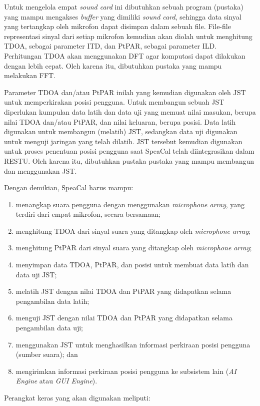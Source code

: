 Untuk mengelola empat \textit{sound card} ini dibutuhkan sebuah program (pustaka) yang mampu mengakses \textit{buffer} yang dimiliki \textit{sound card}, sehingga data sinyal yang tertangkap oleh mikrofon dapat disimpan dalam sebuah file. File-file representasi sinyal dari setiap mikrofon kemudian akan diolah untuk menghitung TDOA, sebagai parameter ITD, dan PtPAR, sebagai parameter ILD. Perhitungan TDOA akan menggunakan DFT agar komputasi dapat dilakukan dengan lebih cepat. Oleh karena itu, dibutuhkan pustaka yang mampu melakukan FFT.

Parameter TDOA dan/atau PtPAR inilah yang kemudian digunakan oleh JST untuk memperkirakan posisi pengguna. Untuk membangun sebuah JST diperlukan kumpulan data latih dan data uji yang memuat nilai masukan, berupa nilai TDOA dan/atau PtPAR, dan nilai keluaran, berupa posisi. Data latih digunakan untuk membangun (melatih) JST, sedangkan data uji digunakan untuk menguji jaringan yang telah dilatih. JST tersebut kemudian digunakan untuk proses penentuan posisi pengguna saat SpeaCal telah diintegrasikan dalam RESTU. Oleh karena itu, dibutuhkan pustaka pustaka yang mampu membangun dan menggunakan JST.

Dengan demikian, SpeaCal harus mampu:

\begin{enumerate}
\item menangkap suara pengguna dengan menggunakan \textit{microphone array}, yang terdiri dari empat mikrofon, secara bersamaan;
\item menghitung TDOA dari sinyal suara yang ditangkap oleh \textit{microphone array};
\item menghitung PtPAR dari sinyal suara yang ditangkap oleh \textit{microphone array};
\item menyimpan data TDOA, PtPAR, dan posisi untuk membuat data latih dan data uji JST;
\item melatih JST dengan nilai TDOA dan PtPAR yang didapatkan selama pengambilan data latih;
\item menguji JST dengan nilai TDOA dan PtPAR yang didapatkan selama pengambilan data uji;
\item menggunakan JST untuk menghasilkan informasi perkiraan posisi pengguna (sumber suara); dan
\item mengirimkan informasi perkiraan posisi pengguna ke subsistem lain (\textit{AI Engine} atau \textit{GUI Engine}).
\end{enumerate}

Perangkat keras yang akan digunakan meliputi:

